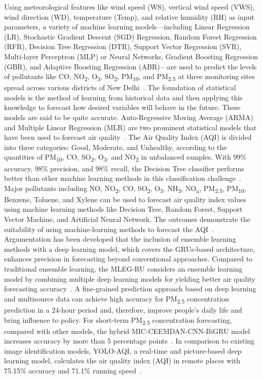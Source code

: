 \documentclass[conference]{IEEEtran}
\begin{document}
Using meteorological features like wind speed (WS), vertical wind speed (VWS), wind direction (WD), temperature (Temp), and relative humidity (RH) as input parameters, a variety of machine learning models—including Linear Regression (LR), Stochastic Gradient Descent (SGD) Regression, Random Forest Regression (RFR), Decision Tree Regression (DTR), Support Vector Regression (SVR), Multi-layer Perceptron (MLP) or Neural Networks, Gradient Boosting Regression (GBR), and Adaptive Boosting Regression (ABR)—are used to predict the levels of pollutants like CO, NO\textsubscript{2}, O\textsubscript{3}, SO\textsubscript{2}, PM\textsubscript{10}, and PM\textsubscript{2.5} at three monitoring sites spread across various districts of New Delhi~\cite{b5,b6}. The foundation of statistical models is the method of learning from historical data and then applying this knowledge to forecast how desired variables will behave in the future. These models are said to be quite accurate. Auto-Regressive Moving Average (ARMA) and Multiple Linear Regression (MLR) are two prominent statistical models that have been used to forecast air quality~\cite{b7,b8}. The Air Quality Index (AQI) is divided into three categories: Good, Moderate, and Unhealthy, according to the quantities of PM\textsubscript{10}, CO, SO\textsubscript{2}, O\textsubscript{3}, and NO\textsubscript{2} in unbalanced samples. With 99\% accuracy, 98\% precision, and 98\% recall, the Decision Tree classifier performs better than other machine learning methods in this classification challenge~\cite{b9}. Major pollutants including NO, NO\textsubscript{2}, CO, SO\textsubscript{2}, O\textsubscript{3}, NH\textsubscript{3}, NO\textsubscript{x}, PM\textsubscript{2.5}, PM\textsubscript{10}, Benzene, Toluene, and Xylene can be used to forecast air quality index values using machine learning methods like Decision Tree, Random Forest, Support Vector Machine, and Artificial Neural Network. The outcomes demonstrate the suitability of using machine-learning methods to forecast the AQI~\cite{b10}. Argumentation has been developed that the inclusion of ensemble learning methods with a deep learning model, which covers the GRUs-based architecture, enhances precision in forecasting beyond conventional approaches. Compared to traditional ensemble learning, the MLEG-RU considers an ensemble learning model by combining multiple deep learning models for yielding better air quality forecasting accuracy~\cite{b11}. A fine-grained prediction approach based on deep learning and multisource data can achieve high accuracy for PM\textsubscript{2.5} concentration prediction in a 24-hour period and, therefore, improve people's daily life and bring influence to policy. For short-term PM\textsubscript{2.5} concentration forecasting, compared with other models, the hybrid MIC-CEEMDAN-CNN-BiGRU model increases accuracy by more than 5 percentage points~\cite{b12,b13}. In comparison to existing image identification models, YOLO-AQI, a real-time and picture-based deep learning model, calculates the air quality index (AQI) in remote places with 75.15\% accuracy and 71.1\% running speed~\cite{b14}.
\end{document}
